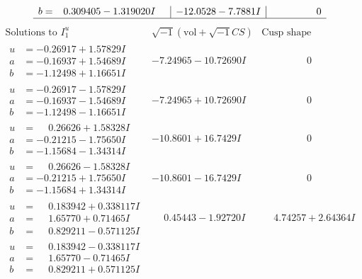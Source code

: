 \documentclass[1p]{elsarticle_modified}
\theoremstyle{definition}
\newcommand{\I}{\sqrt{-1}}
\begin{document}
$$\begin{array}{c|c|c}
\begin{aligned}
b &= \phantom{-}0.309405 - 1.319020 I\end{aligned}
 & -12.0528 - 7.7881 I & \phantom{-0.000000 } 0\\
 \hline 
 \end{array}$$\newpage$$\begin{array}{c|c|c}  
\text{Solutions to }I^u_{1}& \I (\text{vol} + \sqrt{-1}CS) & \text{Cusp shape}\\
 \hline 
\begin{aligned}
u &= -0.26917 + 1.57829 I \\
a &= -0.16937 + 1.54689 I \\
b &= -1.12498 + 1.16651 I\end{aligned}
 & -7.24965 - 10.72690 I & \phantom{-0.000000 } 0 \\ \hline\begin{aligned}
u &= -0.26917 - 1.57829 I \\
a &= -0.16937 - 1.54689 I \\
b &= -1.12498 - 1.16651 I\end{aligned}
 & -7.24965 + 10.72690 I & \phantom{-0.000000 } 0 \\ \hline\begin{aligned}
u &= \phantom{-}0.26626 + 1.58328 I \\
a &= -0.21215 - 1.75650 I \\
b &= -1.15684 - 1.34314 I\end{aligned}
 & -10.8601 + 16.7429 I & \phantom{-0.000000 } 0 \\ \hline\begin{aligned}
u &= \phantom{-}0.26626 - 1.58328 I \\
a &= -0.21215 + 1.75650 I \\
b &= -1.15684 + 1.34314 I\end{aligned}
 & -10.8601 - 16.7429 I & \phantom{-0.000000 } 0 \\ \hline\begin{aligned}
u &= \phantom{-}0.183942 + 0.338117 I \\
a &= \phantom{-}1.65770 + 0.71465 I \\
b &= \phantom{-}0.829211 - 0.571125 I\end{aligned}
 & \phantom{-}0.45443 - 1.92720 I & \phantom{-}4.74257 + 2.64364 I \\ \hline\begin{aligned}
u &= \phantom{-}0.183942 - 0.338117 I \\
a &= \phantom{-}1.65770 - 0.71465 I \\
b &= \phantom{-}0.829211 + 0.571125 I\end{aligned}

\end{array}$$
\end{document}
